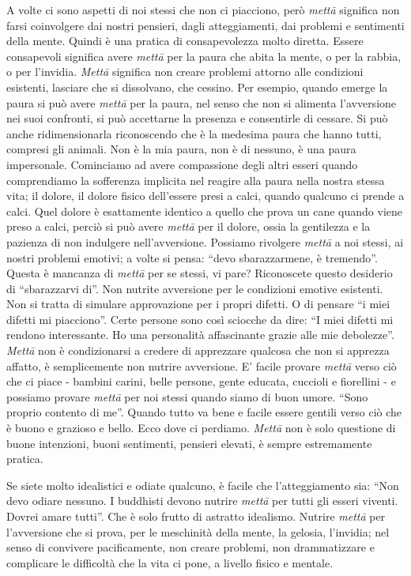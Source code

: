 A volte ci sono aspetti di noi stessi che non ci piacciono, però \textit{mettā}
significa non farsi coinvolgere dai nostri pensieri, dagli
atteggiamenti, dai problemi e sentimenti della mente. Quindi è una
pratica di consapevolezza molto diretta. Essere consapevoli significa
avere \textit{mettā} per la paura che abita la mente, o per la rabbia, o per
l'invidia. \textit{Mettā} significa non creare problemi attorno alle condizioni
esistenti, lasciare che si dissolvano, che cessino. Per esempio, quando
emerge la paura si può avere \textit{mettā} per la paura, nel senso che non si
alimenta l'avversione nei suoi confronti, si può accettarne la presenza
e consentirle di cessare. Si può anche ridimensionarla riconoscendo che
è la medesima paura che hanno tutti, compresi gli animali. Non è la mia
paura, non è di nessuno, è una paura impersonale. Cominciamo ad avere
compassione degli altri esseri quando comprendiamo la sofferenza
implicita nel reagire alla paura nella nostra stessa vita; il dolore, il
dolore fisico dell'essere presi a calci, quando qualcuno ci prende a
calci. Quel dolore è esattamente identico a quello che prova un cane
quando viene preso a calci, perciò si può avere \textit{mettā} per il dolore,
ossia la gentilezza e la pazienza di non indulgere nell'avversione.
Possiamo rivolgere \textit{mettā} a noi stessi, ai nostri problemi emotivi; a
volte si pensa: ``devo sbarazzarmene, è tremendo''. Questa è mancanza di
\textit{mettā} per se stessi, vi pare? Riconoscete questo desiderio di
``sbarazzarvi di''. Non nutrite avversione per le condizioni emotive
esistenti. Non si tratta di simulare approvazione per i propri difetti.
O di pensare ``i miei difetti mi piacciono''. Certe persone sono così
sciocche da dire: ``I miei difetti mi rendono interessante. Ho una
personalità affascinante grazie alle mie debolezze''. \textit{Mettā} non è
condizionarsi a credere di apprezzare qualcosa che non si apprezza
affatto, è semplicemente non nutrire avversione. E' facile provare \textit{mettā}
verso ciò che ci piace - bambini carini, belle persone, gente educata,
cuccioli e fiorellini - e possiamo provare \textit{mettā} per noi stessi quando
siamo di buon umore. ``Sono proprio contento di me''. Quando tutto va bene
e facile essere gentili verso ciò che è buono e grazioso e bello. Ecco
dove ci perdiamo. \textit{Mettā} non è solo questione di buone intenzioni, buoni
sentimenti, pensieri elevati, è sempre estremamente pratica.

Se siete molto idealistici e odiate qualcuno, è facile che
l'atteggiamento sia: ``Non devo odiare nessuno. I buddhisti devono
nutrire \textit{mettā} per tutti gli esseri viventi. Dovrei amare tutti''. Che è
solo frutto di astratto idealismo. Nutrire \textit{mettā} per l'avversione che si
prova, per le meschinità della mente, la gelosia, l'invidia; nel senso
di convivere pacificamente, non creare problemi, non drammatizzare e
complicare le difficoltà che la vita ci pone, a livello fisico e
mentale.

